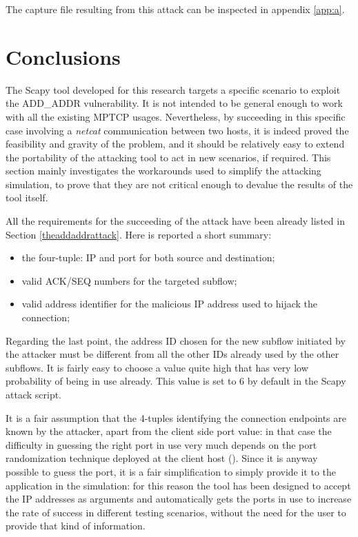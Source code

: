 The capture file resulting from this attack can be inspected in appendix \ref{app:a}.

\section{Conclusions} 
\label{limitationsandfuturework}
The Scapy tool developed for this research targets a specific scenario to exploit the ADD\_ADDR vulnerability. It is not intended to be general enough to work with all the existing MPTCP usages. Nevertheless, by succeeding in this specific case involving a \textit{netcat} communication between two hosts, it is indeed proved the feasibility and gravity of the problem, and it should be relatively easy to extend the portability of the attacking tool to act in new scenarios, if required.
This section mainly investigates the workarounds used to simplify the attacking simulation, to prove that they are not critical enough to devalue the results of the tool itself.

All the requirements for the succeeding of the attack have been already listed in Section \ref{theaddaddrattack}. Here is reported a short summary:

\begin{itemize}  
\item the four-tuple: IP and port for both source and destination;
\item valid ACK/SEQ numbers for the targeted subflow;
\item valid address identifier for the malicious IP address used to hijack the connection;
\end{itemize}

Regarding the last point, the address ID chosen for the new subflow initiated by the attacker must be different from all the other IDs already used by the other subflows. It is fairly easy to choose a value quite high that has very low probability of being in use already. This value is set to 6 by default in the Scapy attack script.

It is a fair assumption that the 4-tuples identifying the connection endpoints are known by the attacker, apart from the client side port value: in that case the difficulty in guessing the right port in use very much depends on the port randomization technique deployed at the client host (). Since it is anyway possible to guess the port, it is a fair simplification to simply provide it to the application in the simulation: for this reason the tool has been designed to accept the IP addresses as arguments and automatically gets the ports in use to increase the rate of success in different testing scenarios, without the need for the user to provide that kind of information.

